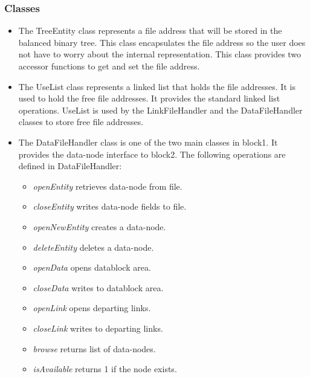 \subsubsection*{Classes}
\begin{itemize}

\item The TreeEntity class represents a file address that will be stored in
  the balanced binary tree.  This class encapsulates the file address so the
  user does not have to worry about the internal representation.  This class
  provides two accessor functions to get and set the file address.

\item The UseList class represents a linked list that holds the file
  addresses.  It is used to hold the free file addresses. It provides the
  standard linked list operations.  UseList is used by the LinkFileHandler and
  the DataFileHandler classes to store free file addresses.
%
%


\item The DataFileHandler class is one of the two main classes in block1.  It
provides the data-node interface to block2.  The following operations are
defined in DataFileHandler: 

\begin{itemize}
  \item{\em openEntity} retrieves data-node from file.
  \item{\em closeEntity} writes data-node fields to file.
  \item{\em openNewEntity} creates a data-node.
  \item{\em deleteEntity} deletes a data-node.
  \item{\em openData} opens datablock area.
  \item{\em closeData} writes to datablock area.
  \item{\em openLink} opens departing links.
  \item{\em closeLink} writes to departing links.
  \item{\em browse} returns list of data-nodes.
  \item{\em isAvailable} returns 1 if the node exists.
\end{itemize}


\end{itemize}
